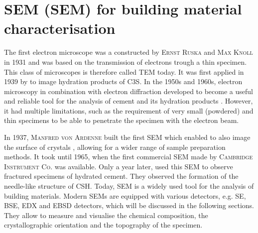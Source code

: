 
\FloatBarrier
\section{\Acl*{SEM} (\acs*{SEM}) for building material characterisation}

The first electron microscope was a constructed by \textsc{Ernst Ruska} and \textsc{Max Knoll} in 1931 \cite{knoll.1932} and was based on the transmission of electrons trough a thin specimen.
This class of microscopes is therefore called \acs{TEM} today.
It was first applied in 1939 by \textcite{rapczewski.1939} to image hydration products of \ac{C3S}.
In the 1950s and 1960s, electron microscopy in combination with electron diffraction developed to become a useful and reliable tool for the analysis of cement and its hydration products \cite{grudemo.1960, grudemo.1965}.
However, it had multiple limitations, such as the requirement of very small (powdered) and thin specimens to be able to penetrate the specimen with the electron beam.

In 1937, \textsc{Manfred von Ardenne} built the first \ac{SEM} which enabled to also image the surface of  crystals \cite{vonardenne.1938}, allowing for a wider range of sample preparation methods.
It took until 1965, when the first commercial \ac{SEM} made by \textsc{Cambridge Instrument Co.} was available.
Only a year later, \textcite{chatterji.1966} used this \ac{SEM} to observe fractured specimens of hydrated cement.
They observed the formation of the needle-like structure of \ac{CSH}.
Today, \ac{SEM} is a widely used tool for the analysis of building materials.
Modern \ac{SEM}s are equipped with various detectors, e.g. \ac{SE}, \ac{BSE}, \ac{EDX} and \ac{EBSD} detectors, which will be discussed in the following sections.
They allow to measure and visualise the chemical composition, the crystallographic orientation and the topography of the specimen.














